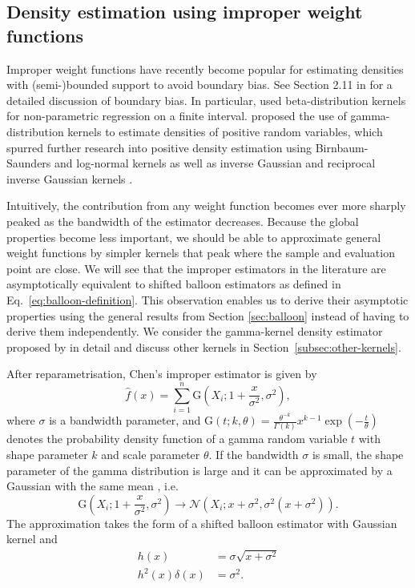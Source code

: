 \subsection{Density estimation using improper weight functions}

Improper weight functions have recently become popular for estimating densities with (semi-)bounded support to avoid boundary bias. See Section 2.11 in \citet{Wand1995} for a detailed discussion of boundary bias. In particular, \citet{Brown1999} used beta-distribution kernels for non-parametric regression on a finite interval. \citet{Chen2000} proposed the use of gamma-distribution kernels to estimate densities of positive random variables, which spurred further research into positive density estimation using Birnbaum-Saunders and log-normal kernels \citep{Jin2003} as well as inverse Gaussian and reciprocal inverse Gaussian kernels \citep{Scaillet2004}. 

Intuitively, the contribution from any weight function becomes ever more sharply peaked as the bandwidth of the estimator decreases. Because the global properties become less important, we should be able to approximate general weight functions by simpler kernels that peak where the sample and evaluation point are close. We will see that the improper estimators in the literature are asymptotically equivalent to shifted balloon estimators as defined in Eq.~\eqref{eq:balloon-definition}. This observation enables us to derive their asymptotic properties using the general results from Section \ref{sec:balloon} instead of having to derive them independently. We consider the gamma-kernel density estimator proposed by \citet{Chen2000} in detail and discuss other kernels in Section~\ref{subsec:other-kernels}.

After reparametrisation, Chen's improper estimator is given by
\[
\hat{f}\left(x\right)=\sum_{i=1}^{n}\mathrm{G}\left(X_{i};1+\frac{x}{\sigma^{2}},\sigma^{2}\right),
\]
where $\sigma$ is a bandwidth parameter, and $\mathrm{G}\left(t;k,\theta\right)=\frac{\theta^{-k}}{\Gamma\left(k\right)}x^{k-1}\exp\left(-\frac{t}{\theta}\right)$ denotes the probability density function of a gamma random variable $t$ with shape parameter $k$ and scale parameter $\theta$. If the bandwidth $\sigma$ is small, the shape parameter of the gamma distribution is large and it can be approximated by a Gaussian with the same mean \citep{Johnson1994}, i.e.
\[
\mathrm{G}\left(X_{i};1+\frac{x}{\sigma^{2}},\sigma^{2}\right)\rightarrow\mathcal{N}\left(X_{i};x+\sigma^{2},\sigma^{2}\left(x+\sigma^{2}\right)\right).
\]
The approximation takes the form of a shifted balloon estimator with Gaussian kernel and 
\begin{align*}
h\left(x\right) & =\sigma\sqrt{x+\sigma^{2}}\\
h^{2}\left(x\right)\delta\left(x\right) & =\sigma^{2}.
\end{align*}


